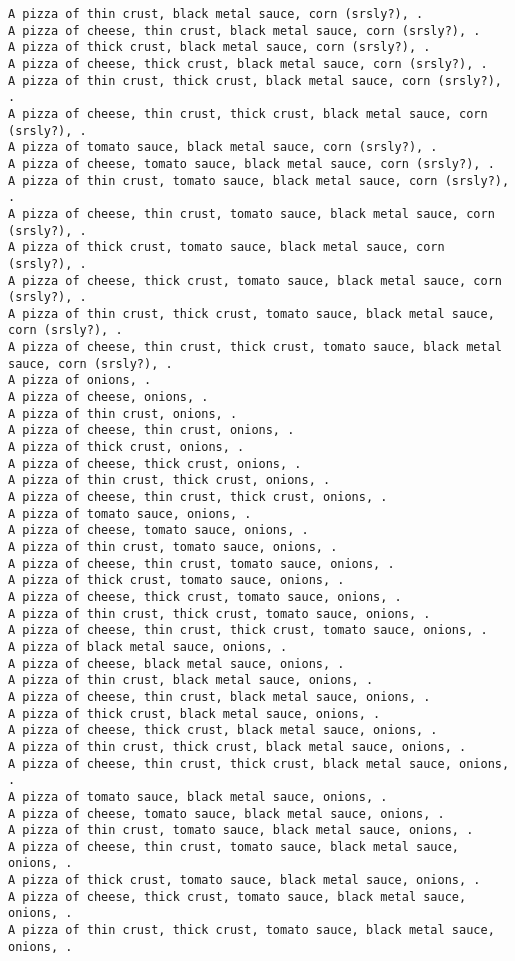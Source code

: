 \documentclass[11pt]{article}
\begin{document}
\begin{enumerate}
\begin{verbatim}
A pizza of thin crust, black metal sauce, corn (srsly?), .
A pizza of cheese, thin crust, black metal sauce, corn (srsly?), .
A pizza of thick crust, black metal sauce, corn (srsly?), .
A pizza of cheese, thick crust, black metal sauce, corn (srsly?), .
A pizza of thin crust, thick crust, black metal sauce, corn (srsly?), .
A pizza of cheese, thin crust, thick crust, black metal sauce, corn (srsly?), .
A pizza of tomato sauce, black metal sauce, corn (srsly?), .
A pizza of cheese, tomato sauce, black metal sauce, corn (srsly?), .
A pizza of thin crust, tomato sauce, black metal sauce, corn (srsly?), .
A pizza of cheese, thin crust, tomato sauce, black metal sauce, corn (srsly?), .
A pizza of thick crust, tomato sauce, black metal sauce, corn (srsly?), .
A pizza of cheese, thick crust, tomato sauce, black metal sauce, corn (srsly?), .
A pizza of thin crust, thick crust, tomato sauce, black metal sauce, corn (srsly?), .
A pizza of cheese, thin crust, thick crust, tomato sauce, black metal sauce, corn (srsly?), .
A pizza of onions, .
A pizza of cheese, onions, .
A pizza of thin crust, onions, .
A pizza of cheese, thin crust, onions, .
A pizza of thick crust, onions, .
A pizza of cheese, thick crust, onions, .
A pizza of thin crust, thick crust, onions, .
A pizza of cheese, thin crust, thick crust, onions, .
A pizza of tomato sauce, onions, .
A pizza of cheese, tomato sauce, onions, .
A pizza of thin crust, tomato sauce, onions, .
A pizza of cheese, thin crust, tomato sauce, onions, .
A pizza of thick crust, tomato sauce, onions, .
A pizza of cheese, thick crust, tomato sauce, onions, .
A pizza of thin crust, thick crust, tomato sauce, onions, .
A pizza of cheese, thin crust, thick crust, tomato sauce, onions, .
A pizza of black metal sauce, onions, .
A pizza of cheese, black metal sauce, onions, .
A pizza of thin crust, black metal sauce, onions, .
A pizza of cheese, thin crust, black metal sauce, onions, .
A pizza of thick crust, black metal sauce, onions, .
A pizza of cheese, thick crust, black metal sauce, onions, .
A pizza of thin crust, thick crust, black metal sauce, onions, .
A pizza of cheese, thin crust, thick crust, black metal sauce, onions, .
A pizza of tomato sauce, black metal sauce, onions, .
A pizza of cheese, tomato sauce, black metal sauce, onions, .
A pizza of thin crust, tomato sauce, black metal sauce, onions, .
A pizza of cheese, thin crust, tomato sauce, black metal sauce, onions, .
A pizza of thick crust, tomato sauce, black metal sauce, onions, .
A pizza of cheese, thick crust, tomato sauce, black metal sauce, onions, .
A pizza of thin crust, thick crust, tomato sauce, black metal sauce, onions, .

\end{verbatim}
\end{enumerate}
\end{document}
